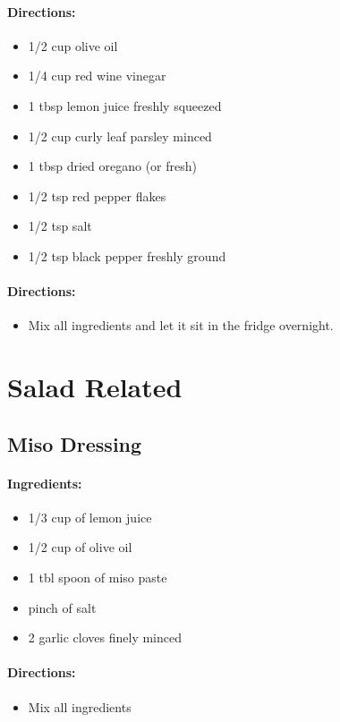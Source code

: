 \documentclass{article}
\begin{document}
\paragraph{Directions:}
\begin{itemize}
  \item 1/2 cup olive oil
  \item 1/4 cup red wine vinegar
  \item 1 tbsp lemon juice freshly squeezed
  \item 1/2 cup curly leaf parsley minced
  \item 1 tbsp dried oregano (or fresh)
  \item 1/2 tsp red pepper flakes
  \item 1/2 tsp salt
  \item 1/2 tsp black pepper freshly ground	
\end{itemize}

\paragraph{Directions:}
\begin{itemize}
  \item Mix all ingredients and let it sit in the fridge overnight.	
\end{itemize}

\section{Salad Related}

\subsection{Miso Dressing}

\paragraph{Ingredients:}

\begin{itemize}
	\item 1/3 cup of lemon juice
	\item 1/2 cup of olive oil
	\item 1 tbl spoon of miso paste
	\item pinch of salt
	\item 2 garlic cloves finely minced
\end{itemize}

\paragraph{Directions:}
\begin{itemize}
	\item Mix all ingredients
\end{itemize}
\end{document}
